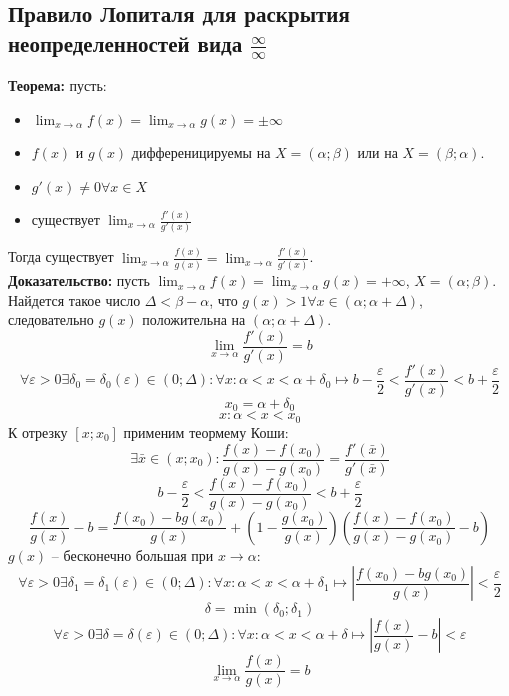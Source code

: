 \documentclass{article}
\newcommand{\theorem}{\textbf{Теорема:} }
\newcommand{\proof}{\textbf{Доказательство:} }
\newcommand{\intr}[2]{$(#1;#2)$}
\newcommand{\otr}[2]{$[#1;#2]$}
\begin{document}
    \subsection*{Правило Лопиталя для раскрытия неопределенностей вида $\frac{\infty}{\infty}$} 
        \theorem пусть:
        \begin {itemize}
            \item $ \lim_{x \to \alpha} f(x) = \lim_{x \to \alpha} g(x) = \pm \infty $
            \item $ f(x)$ и $g(x)$ дифференицируемы на $X = (\alpha;\beta)$ или на $X = (\beta;\alpha)$.
            \item $ g'(x)\neq 0 \forall x \in X $
            \item существует $ \lim_{x \to \alpha} \frac{f'(x)}{g'(x)} $
        \end {itemize}
        Тогда существует $ \lim_{x \to \alpha} \frac{f(x)}{g(x)} = \lim_{x \to \alpha} \frac{f'(x)}{g'(x)} $.
        \\
        \proof пусть $\lim_{x \to \alpha} f(x) = \lim_{x \to \alpha} g(x) = +\infty$, $X = (\alpha;\beta)$.
        Найдется такое число $\Delta < \beta - \alpha$, что $g(x) > 1 \forall x \in (\alpha;\alpha + \Delta)$, следовательно $g(x)$ положительна на \intr{\alpha}{\alpha + \Delta}.
        \[ \lim_{x \to \alpha} \frac{f'(x)}{g'(x)} = b \]
        \[ \forall \varepsilon > 0 \exists \delta_0 = \delta_0(\varepsilon) \in (0; \Delta): \forall x: \alpha < x < \alpha + \delta_0 \longmapsto
            b - \frac{\varepsilon}{2} < \frac{f'(x)}{g'(x)} < b + \frac{\varepsilon}{2} \]
        \[ x_0 = \alpha + \delta_0 \]
        \[ x: \alpha < x < x_0 \]
        К отрезку \otr{x}{x_0} применим теормему Коши:
        \[ \exists \bar x \in (x; x_0):
           \frac{f(x) - f(x_0)}{g(x) - g(x_0)} = \frac{f'(\bar x)}{g'(\bar x)} \]
        \[ b - \frac{\varepsilon}{2} < \frac{f(x) - f(x_0)}{g(x) - g(x_0)} < b + \frac{\varepsilon}{2} \]
        \[ \frac{f(x)}{g(x)} - b = \frac{f(x_0) - b g(x_0)}{g(x)} + \left( 1 - \frac{g(x_0)}{g(x)} \right) \left( \frac{f(x) - f(x_0)}{g(x) - g(x_0)} - b \right) \]
        $g(x)$ -- бесконечно большая при $x \to \alpha$:
        \[ \forall \varepsilon > 0 \exists \delta_1 = \delta_1(\varepsilon) \in (0; \Delta): \forall x: \alpha < x < \alpha + \delta_1 \longmapsto 
           \left| \frac{f(x_0) - b g(x_0)}{g(x)} \right| < \frac{\varepsilon}{2} \]
        \[ \delta = \min (\delta_0; \delta_1) \]
        \[ \forall \varepsilon > 0 \exists \delta = \delta(\varepsilon) \in (0; \Delta): \forall x: \alpha < x < \alpha + \delta \longmapsto
           \left| \frac{f(x)}{g(x)} - b \right| < \varepsilon \]
        \[ \lim_{x \to \alpha} \frac{f(x)}{g(x)} = b \]
\end{document}
